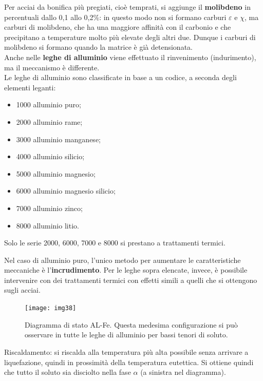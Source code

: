 Per acciai da bonifica più pregiati, cioè temprati, si aggiunge il \textbf{molibdeno} in percentuali dallo 0,1 allo 0,2\%: in questo modo non si formano carburi $\varepsilon$ e $\chi$, ma carburi di molibdeno, che ha una maggiore affinità con il carbonio e che precipitano a temperature molto più elevate degli altri due. Dunque i carburi di molibdeno si formano quando la matrice è già detensionata.\\

Anche nelle \textbf{leghe di alluminio} viene effettuato il rinvenimento (indurimento), ma il meccanismo è differente.\\
Le leghe di alluminio sono classificate in base a un codice, a seconda degli elementi leganti:
\begin{itemize}
    \item 1000 alluminio puro;
    \item 2000 alluminio rame;
    \item 3000 alluminio manganese; 
    \item 4000 alluminio silicio;
    \item 5000 alluminio magnesio;
    \item 6000 alluminio magnesio silicio;
    \item 7000 alluminio zinco;
    \item 8000 alluminio litio.
\end{itemize}
Solo le serie 2000, 6000, 7000 e 8000 si prestano a trattamenti termici.

Nel caso di alluminio puro, l’unico metodo per aumentare le caratteristiche meccaniche è l’\textbf{incrudimento}.
Per le leghe sopra elencate, invece, è possibile intervenire con dei trattamenti termici con effetti simili a quelli che si ottengono sugli acciai.

\begin{figure}[!hbt]
    \texttt{[image: img38]}
    \caption{Diagramma di stato AL-Fe. Questa medesima configurazione si può osservare in tutte le leghe di alluminio per bassi tenori di soluto.}
\end{figure}

Riscaldamento: si riscalda alla temperatura più alta possibile senza arrivare a liquefazione, quindi in prossimità della temperatura eutettica. Si ottiene quindi che tutto il soluto sia disciolto nella fase $\alpha$ (a sinistra nel diagramma).

